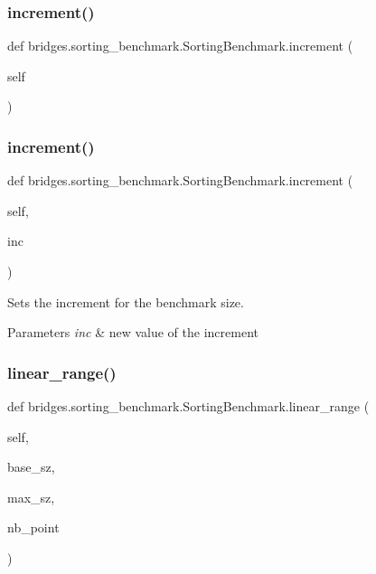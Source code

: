 \subsubsection{\texorpdfstring{increment()}{increment()}\hspace{0.1cm}{\footnotesize\ttfamily [1/2]}}
{\footnotesize\ttfamily def bridges.\+sorting\+\_\+benchmark.\+Sorting\+Benchmark.\+increment (\begin{DoxyParamCaption}\item[{}]{self }\end{DoxyParamCaption})}

\mbox{\label{classbridges_1_1sorting__benchmark_1_1_sorting_benchmark_a3a2f43cd8fdb9f5ca88bd0ac9e6d0e2e}} 
\subsubsection{\texorpdfstring{increment()}{increment()}\hspace{0.1cm}{\footnotesize\ttfamily [2/2]}}
{\footnotesize\ttfamily def bridges.\+sorting\+\_\+benchmark.\+Sorting\+Benchmark.\+increment (\begin{DoxyParamCaption}\item[{}]{self,  }\item[{}]{inc }\end{DoxyParamCaption})}



Sets the increment for the benchmark size. 


\begin{DoxyParams}{Parameters}
{\em inc} & new value of the increment \\
\hline
\end{DoxyParams}
\mbox{\label{classbridges_1_1sorting__benchmark_1_1_sorting_benchmark_ab5bfca8680018f4c043a78b25dbc1948}} 
\subsubsection{\texorpdfstring{linear\_range()}{linear\_range()}}
{\footnotesize\ttfamily def bridges.\+sorting\+\_\+benchmark.\+Sorting\+Benchmark.\+linear\+\_\+range (\begin{DoxyParamCaption}\item[{}]{self,  }\item[{}]{base\+\_\+sz,  }\item[{}]{max\+\_\+sz,  }\item[{}]{nb\+\_\+point }\end{DoxyParamCaption})}

